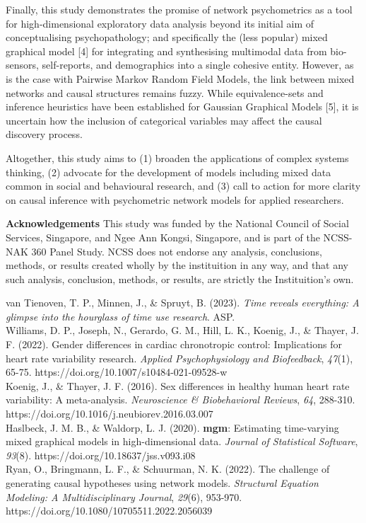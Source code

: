 \documentclass[11pt]{article}
\begin{document}
Finally, this study demonstrates the promise of network psychometrics as a tool for high-dimensional exploratory data analysis beyond its initial aim of conceptualising psychopathology; and specifically the (less popular) mixed graphical model [4] for integrating and synthesising multimodal data from bio-sensors, self-reports, and demographics into a single cohesive entity. However, as is the case with Pairwise Markov Random Field Models, the link between mixed networks and causal structures remains fuzzy. While equivalence-sets and inference heuristics have been established for Gaussian Graphical Models [5], it is uncertain how the inclusion of categorical variables may affect the causal discovery process.

Altogether, this study aims to (1) broaden the applications of complex systems thinking, (2) advocate for the development of models including mixed data common in social and behavioural research, and (3) call to action for more clarity on causal inference with psychometric network models for applied researchers.

\textbf{Acknowledgements} This study was funded by the National Council of Social Services, Singapore, and Ngee Ann Kongsi, Singapore, and is part of the NCSS-NAK 360 Panel Study. NCSS does not endorse any analysis, conclusions, methods, or results created wholly by the instituition in any way, and that any such analysis, conclusion, methods, or results, are strictly the Instituition's own.

\pagebreak
{\small
\noindent[1] van Tienoven, T. P., Minnen, J., \& Spruyt, B. (2023). \textit{Time reveals everything: A glimpse into the hourglass of time use research}. ASP. \\
\noindent[2] Williams, D. P., Joseph, N., Gerardo, G. M., Hill, L. K., Koenig, J., \& Thayer, J. F. (2022). Gender differences in cardiac chronotropic control: Implications for heart rate variability research. \textit{Applied Psychophysiology and Biofeedback}, \textit{47}(1), 65-75. https://doi.org/10.1007/s10484-021-09528-w \\
\noindent[3] Koenig, J., \& Thayer, J. F. (2016). Sex differences in healthy human heart rate variability: A meta-analysis. \textit{Neuroscience \& Biobehavioral Reviews}, \textit{64}, 288-310. https://doi.org/10.1016/j.neubiorev.2016.03.007 \\
\noindent[4] Haslbeck, J. M. B., \& Waldorp, L. J. (2020). \textbf{mgm}: Estimating time-varying mixed graphical models in high-dimensional data. \textit{Journal of Statistical Software}, \textit{93}(8). https://doi.org/10.18637/jss.v093.i08 \\
\noindent[5] Ryan, O., Bringmann, L. F., \& Schuurman, N. K. (2022). The challenge of generating causal hypotheses using network models. \textit{Structural Equation Modeling: A Multidisciplinary Journal}, \textit{29}(6), 953-970. \\ https://doi.org/10.1080/10705511.2022.2056039 \\
}
\end{document}

